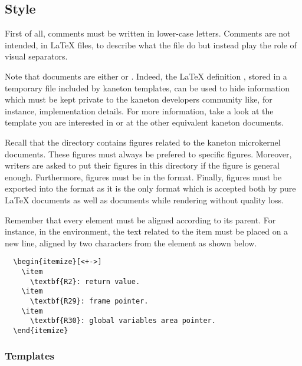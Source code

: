 \subsection{Style}

First of all, comments must be written in lower-case letters. Comments
are not intended, in {\LaTeX} files, to describe what the file do but instead
play the role of visual separators.

Note that documents are either  or . Indeed,
the {\LaTeX} definition , stored in a temporary file
included by kaneton templates, can be used to hide information which must be
kept private to the kaneton developers community like, for instance,
implementation details. For more information, take a look at the template
you are interested in or at the other equivalent kaneton documents.

Recall that the  directory contains figures related
to the kaneton microkernel documents. These figures must always be prefered
to specific figures. Moreover, writers are asked to put their figures in
this directory if the figure is general enough. Furthermore, figures must be
in the  format. Finally, figures must be exported into the
 format as it is the only format which is accepted both by
pure {\LaTeX} documents as well as  documents while rendering
without quality loss.

Remember that every element must be aligned according to its parent. For
instance, in the  environment, the text related to the item
must be placed on a new line, aligned by two characters from the
 element as shown below.

\begin{verbatim}
  \begin{itemize}[<+->]
    \item
      \textbf{R2}: return value.
    \item
      \textbf{R29}: frame pointer.
    \item
      \textbf{R30}: global variables area pointer.
  \end{itemize}
\end{verbatim}


\subsubsection{Templates}

